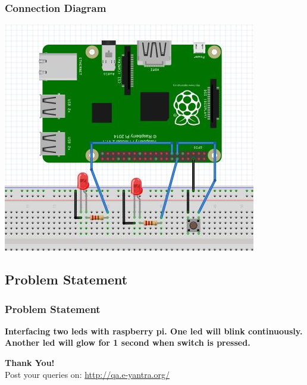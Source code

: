 \documentclass[10pt,red]{beamer}
\begin{document}
\begin{frame}
	\frametitle{Connection Diagram} \pause
	\centering
	\includegraphics[scale=0.6]{external_interrupt}
\end{frame}
\subsection{Problem Statement}
\begin{frame}
	\frametitle{Problem Statement} \pause
	\textbf{Interfacing two leds with raspberry pi. One led will blink continuously. Another led will glow for 1 second when switch is pressed.}
\end{frame}
\begin{frame}
	\hskip4cm
	\textbf{\LARGE Thank You!} \\[20pt]
	\hskip3cm
	\scriptsize Post your queries on: 
	\hyperref[www.e-yantra.org]{\color{blue} http://qa.e-yantra.org/ \color{black}} 
\end{frame}
\end{document}
